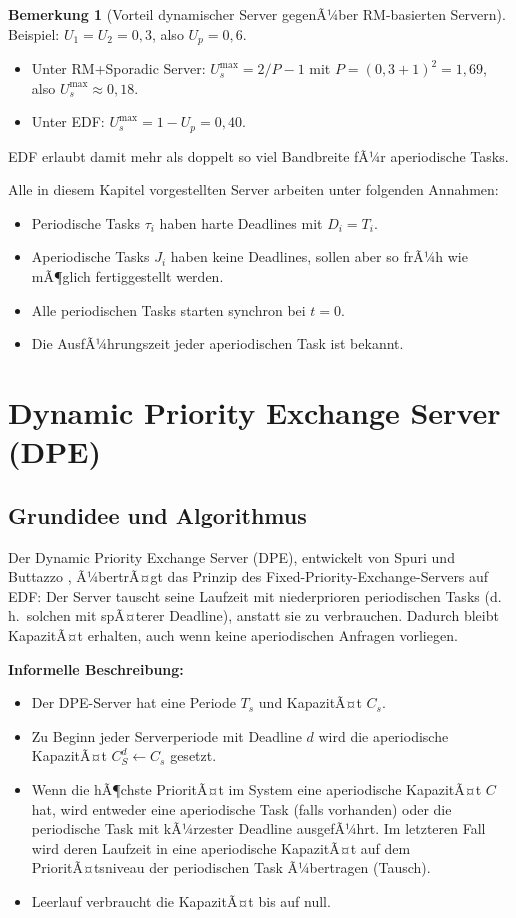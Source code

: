 ﻿\documentclass[a4paper,12pt]{report}
\theoremstyle{definition}
\newtheorem{bemerkung}{Bemerkung}[chapter]
\begin{document}
\begin{bemerkung}[Vorteil dynamischer Server gegenÃ¼ber RM-basierten Servern]
	Beispiel: $U_1 = U_2 = 0{,}3$, also $U_p = 0{,}6$.
	\begin{itemize}
		\item Unter RM+Sporadic Server: $U_s^{\max} = 2/P - 1$ mit
		      $P = (0{,}3+1)^2 = 1{,}69$, also $U_s^{\max} \approx 0{,}18$.
		\item Unter EDF: $U_s^{\max} = 1 - U_p = 0{,}40$.
	\end{itemize}
	EDF erlaubt damit mehr als doppelt so viel Bandbreite fÃ¼r aperiodische Tasks.
\end{bemerkung}

Alle in diesem Kapitel vorgestellten Server arbeiten unter folgenden Annahmen:
\begin{itemize}
	\item Periodische Tasks $\tau_i$ haben harte Deadlines mit $D_i = T_i$.
	\item Aperiodische Tasks $J_i$ haben keine Deadlines, sollen aber so frÃ¼h wie
	      mÃ¶glich fertiggestellt werden.
	\item Alle periodischen Tasks starten synchron bei $t=0$.
	\item Die AusfÃ¼hrungszeit jeder aperiodischen Task ist bekannt.
\end{itemize}

\section{Dynamic Priority Exchange Server (DPE)}

\subsection{Grundidee und Algorithmus}

Der Dynamic Priority Exchange Server (DPE), entwickelt von Spuri und Buttazzo
\cite{Spuri1996}, Ã¼bertrÃ¤gt das Prinzip des Fixed-Priority-Exchange-Servers auf
EDF: Der Server tauscht seine Laufzeit mit niederprioren periodischen Tasks
(d.\,h.\ solchen mit spÃ¤terer Deadline), anstatt sie zu verbrauchen. Dadurch
bleibt KapazitÃ¤t erhalten, auch wenn keine aperiodischen Anfragen vorliegen.

\textbf{Informelle Beschreibung:}

\begin{itemize}
	\item Der DPE-Server hat eine Periode $T_s$ und KapazitÃ¤t $C_s$.
	\item Zu Beginn jeder Serverperiode mit Deadline $d$ wird die aperiodische
	      KapazitÃ¤t $C_S^d \leftarrow C_s$ gesetzt.
	\item Wenn die hÃ¶chste PrioritÃ¤t im System eine aperiodische KapazitÃ¤t $C$
	      hat, wird entweder eine aperiodische Task (falls vorhanden) oder die
	      periodische Task mit kÃ¼rzester Deadline ausgefÃ¼hrt. Im letzteren Fall
	      wird deren Laufzeit in eine aperiodische KapazitÃ¤t auf dem PrioritÃ¤tsniveau
	      der periodischen Task Ã¼bertragen (Tausch).
	\item Leerlauf verbraucht die KapazitÃ¤t bis auf null.
\end{itemize}
\end{document}

